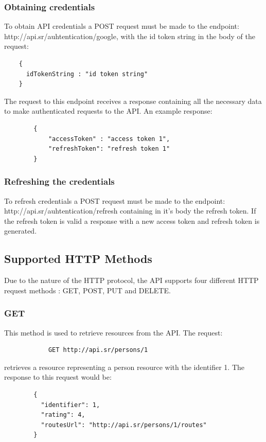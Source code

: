     \subsubsection*{Obtaining credentials} \label{apiobtcred}
    To obtain API credentials a POST \cite{httppostdocs} request must be made to the endpoint: http://api.sr/auhtentication/google, 
    with the id token string in the body of the request:
    \begin{lstlisting}
    {
      idTokenString : "id token string"
    }
     \end{lstlisting}
    The request to this endpoint receives a response containing all the necessary data to make authenticated requests to the API.
    An example response:
    \begin{lstlisting}
        {
            "accessToken" : "access token 1",
            "refreshToken": "refresh token 1"
        }
    \end{lstlisting}

    \subsubsection*{Refreshing the credentials}
    To refresh credentials a POST request must be made to the endpoint: http://api.sr/auhtentication/refresh containing in it's
    body the refresh token. If the refresh token is valid a response with a new access token and refresh token is generated.

    \newpage
    \subsection{Supported HTTP Methods}
        Due to the nature of the HTTP protocol, the API supports four different HTTP request methods \cite{apihttpverbsdocs}: GET, POST, PUT and DELETE.
        
        \subsubsection*{GET}
        This method is used to retrieve resources from the API. The request: 
        \begin{verbatim}
            GET http://api.sr/persons/1 
        \end{verbatim}
        \vspace{-\baselineskip}
        retrieves a resource representing a person resource with the identifier 1. 
        The response to this request would be:
        \begin{lstlisting}
        {
          "identifier": 1,
          "rating": 4,
          "routesUrl": "http://api.sr/persons/1/routes"
        }
        \end{lstlisting}

